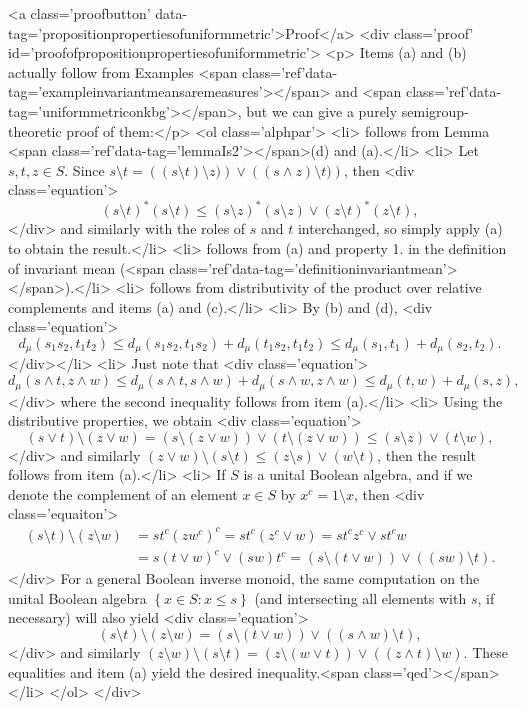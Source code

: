 <a class='proofbutton' data-tag='propositionpropertiesofuniformmetric'>Proof</a>
<div class='proof' id='proofofpropositionpropertiesofuniformmetric'>
	<p>
	Items (a) and (b) actually follow from Examples <span class='ref'data-tag='exampleinvariantmeansaremeasures'></span> and <span class='ref'data-tag='uniformmetriconkbg'></span>, but we can give a purely semigroup-theoretic proof of them:</p>
	<ol class='alphpar'>
		<li> follows from Lemma <span class='ref'data-tag='lemmaIs2'></span>(d) and (a).</li>
		<li> Let $s,t,z\in S$. Since $s\setminus t=\left((s\setminus t)\setminus z)\right)\lor\left((s\land z)\setminus t)\right)$, then
			<div class='equation'>\[
				(s\setminus t)^*(s\setminus t)\leq(s\setminus z)^*(s\setminus z)\lor(z\setminus t)^*(z\setminus t),
			\]</div>
			and similarly with the roles of $s$ and $t$ interchanged, so simply apply (a) to obtain the result.</li>
		<li> follows from (a) and property 1. in the definition of invariant mean (<span class='ref'data-tag='definitioninvariantmean'></span>).</li>
		<li> follows from distributivity of the product over relative complements and items (a) and (c).</li>
		<li> By (b) and (d),
			<div class='equation'>\[
				d_\mu(s_1s_2,t_1t_2)\leq d_\mu(s_1s_2,t_1s_2)+d_\mu(t_1s_2,t_1t_2)\leq d_\mu(s_1,t_1)+d_\mu(s_2,t_2).
			\]</div></li>
		<li> Just note that
			<div class='equation'>\[
				d_\mu(s\land t,z\land w)\leq d_\mu(s\land t, s\land w)+d_\mu(s\land w,z\land w)\leq d_\mu(t,w)+d_\mu(s,z),
			\]</div>
			where the second inequality follows from item (a).</li>
		<li> Using the distributive properties, we obtain
			<div class='equation'>\[
				(s\lor t)\setminus(z\lor w)=(s\setminus(z\lor w))\lor(t\setminus(z\lor w))\leq (s\setminus z)\lor (t\setminus w),
			\]</div>
			and similarly $(z\lor w)\setminus(s\setminus t)\leq (z\setminus s)\lor (w\setminus t)$, then the result follows from item (a).</li>
		<li> If $S$ is a unital Boolean algebra, and if we denote the complement of an element $x\in S$ by $x^c=1\setminus x$, then
			<div class='equaiton'>\begin{align*}
				(s\setminus t)\setminus(z\setminus w)&=st^c(zw^c)^c=st^c(z^c\lor w)=st^cz^c\lor st^cw\\
				&=s(t\lor w)^c\lor (sw)t^c=(s\setminus(t\lor w))\lor((sw)\setminus t).
			\end{align*}</div>
			For a general Boolean inverse monoid, the same computation on the unital Boolean algebra $\left\{x\in S:x\leq s\right\}$ (and intersecting all elements with $s$, if necessary) will also yield
			<div class='equation'>\[
				(s\setminus t)\setminus(z\setminus w)=(s\setminus(t\lor w))\lor((s\land w)\setminus t),
			\]</div>
				and similarly $(z\setminus w)\setminus (s\setminus t)=(z\setminus(w\lor t))\lor((z\land t)\setminus w)$. These equalities and item (a) yield the desired inequality.<span class='qed'></span></li>
	</ol>
</div>

